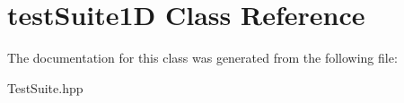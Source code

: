\hypertarget{classtest_suite1_d}{}\section{test\+Suite1D Class Reference}
\label{classtest_suite1_d}


The documentation for this class was generated from the following file\+:\begin{DoxyCompactItemize}
\item 
Test\+Suite.\+hpp\end{DoxyCompactItemize}
